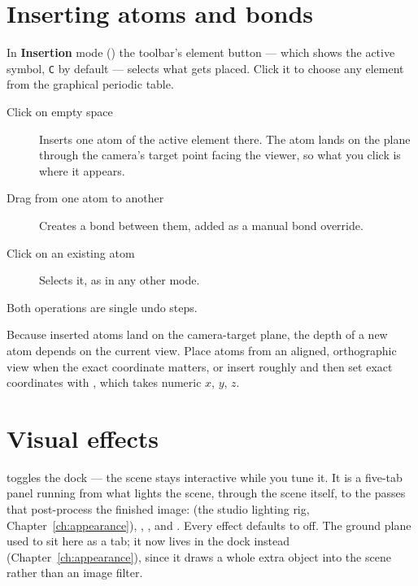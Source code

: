 \section{Inserting atoms and bonds}

In \textbf{Insertion} mode () the toolbar's element button --- which
shows the active symbol, \texttt{C} by default --- selects what gets
placed. Click it to choose any element from the graphical periodic table.

\begin{description}
  \item[Click on empty space] Inserts one atom of the active element there.
    The atom lands on the plane through the camera's target point facing
    the viewer, so what you click is where it appears.
  \item[Drag from one atom to another] Creates a bond between them, added
    as a manual bond override.
  \item[Click on an existing atom] Selects it, as in any other mode.
\end{description}

Both operations are single undo steps.

\begin{calnote}
Because inserted atoms land on the camera-target plane, the depth of a new
atom depends on the current view. Place atoms from an aligned, orthographic
view when the exact coordinate matters, or insert roughly and then set
exact coordinates with \menusep{}, which takes
numeric $x$, $y$, $z$.
\end{calnote}

\section{Visual effects}
\label{sec:visual-effects}

\menusep{} toggles the 
dock --- the scene stays interactive while you tune it. It is a five-tab
panel running from what lights the scene, through the scene itself, to the
passes that post-process the finished image:  (the studio
lighting rig, Chapter~\ref{ch:appearance}), , ,
 and . Every effect defaults to off. The ground plane
used to sit here as a  tab; it now lives in the  dock instead (Chapter~\ref{ch:appearance}), since it draws a
whole extra object into the scene rather than an image filter.

